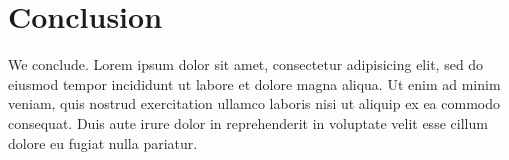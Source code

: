 \section{Conclusion}
\label{s:conclusion}

We conclude. Lorem ipsum dolor sit amet, consectetur adipisicing elit,
sed do eiusmod tempor incididunt ut labore et dolore magna aliqua. Ut
enim ad minim veniam, quis nostrud exercitation ullamco laboris nisi
ut aliquip ex ea commodo consequat. Duis aute irure dolor in
reprehenderit in voluptate velit esse cillum dolore eu fugiat nulla
pariatur.
